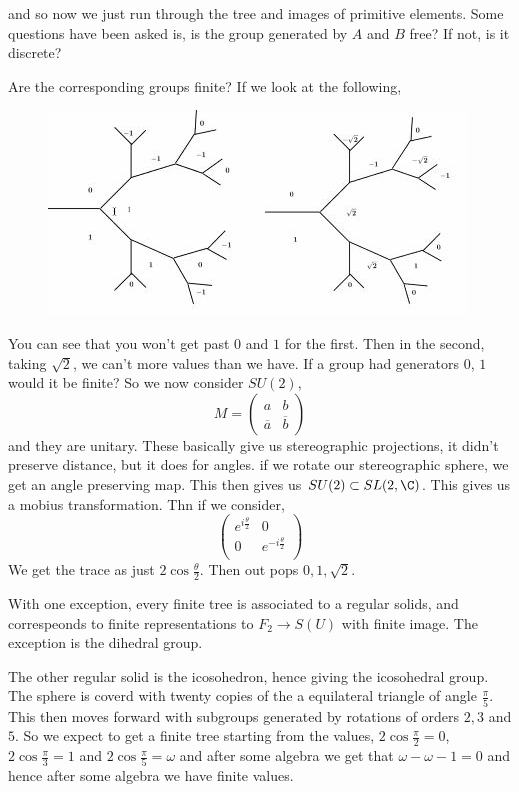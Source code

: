 \documentclass{article}
\begin{document}
and so now we just run through the tree and images of primitive elements. Some questions have been asked is, is the group generated by $A$ and $B$ free? If not, is it discrete?

Are the corresponding groups finite? If we look at the following,
\begin{figure}[!ht]
  \centering
  \includegraphics{./figures/L1.6}
\end{figure}

You can see that you won't get past $0$ and $1$ for the first. Then in the second, taking $\sqrt 2$, we can't more values than we have. If a group had generators $0$, $1$ would it be finite? So we now consider $SU(2)$,
$$ M = \begin{pmatrix}
  a & b \\ \overline{a} & \overline{b}
\end{pmatrix} $$
and they are unitary. These basically give us stereographic projections, it didn't preserve distance, but it does for angles. if we rotate our stereographic sphere, we get an angle preserving map. This then gives us $SU(2) \subset SL(2, \C)$. This gives us a mobius transformation. Thn if we consider,
$$ \begin{pmatrix}
  e^{i \frac{\theta}{2}} & 0 \\
  0 & e^{-i \frac{\theta}{2}} \\
\end{pmatrix} $$
We get the trace as just $2\cos \frac{\theta}{2}$. Then out pops $0, 1, \sqrt 2$.

\begin{nthm}
  With one exception, every finite tree is associated to a regular solids, and correspeonds to finite representations to $F_2 \to S(U)$ with finite image. The exception is the dihedral group.
\end{nthm}

The other regular solid is the icosohedron, hence giving the icosohedral group. The sphere is coverd with twenty copies of the a equilateral triangle of angle $\frac{\pi}{5}$. This then moves forward with subgroups generated by rotations of orders $2, 3$ and $5$. So we expect to get a finite tree starting from the values, $2\cos \frac{\pi}{2} = 0$, $2\cos \frac{\pi}{3} = 1$ and $2\cos \frac{\pi}{5} = \omega$ and after some algebra we get that $\omega - \omega - 1 =0$ and hence after some algebra we have finite values.
\end{document}
